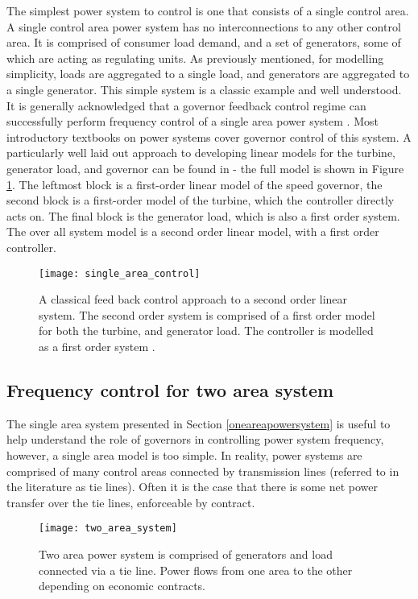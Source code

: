 The simplest power system to control is one that consists of a single control area. A single control area power system has no interconnections to any other control area. It is comprised of consumer load demand, and a set of generators, some of which are acting as regulating units. As previously mentioned, for modelling simplicity, loads are aggregated to a single load, and generators are aggregated to a single generator. This simple system is a classic example and well understood. It is generally acknowledged that a governor feedback control regime can successfully perform frequency control of a single area power system \cite{Wood2013, Grainger1994, Kothari2011}. Most introductory textbooks on power systems cover governor control of this system. A particularly well laid out approach to developing linear models for the turbine, generator load, and governor can be found in \cite{Kothari2011} - the full model is shown in Figure \ref{fig:singleareacontrol}. The leftmost block is a first-order linear model of the speed governor, the second block is a first-order model of the turbine, which the controller directly acts on. The final block is the generator load, which is also a first order system. The over all system model is a second order linear model, with a first order controller.

\begin{figure}[ht]
\centering
\texttt{[image: single\_area\_control]}
\caption{A classical feed back control approach to a second order linear system. The second order system is comprised of a first order model for both the turbine, and generator load. The controller is modelled as a first order system \cite{Kothari2011}.}
\label{fig:singleareacontrol}
\end{figure}


\subsection{Frequency control for two area system}
The single area system presented in Section \ref{oneareapowersystem} is useful to help understand the role of governors in controlling power system frequency, however, a single area model is too simple. In reality, power systems are comprised of many control areas connected by transmission lines (referred to in the literature as tie lines). Often it is the case that there is some net power transfer over the tie lines, enforceable by contract.

\begin{figure}[ht]
	\centering
	\texttt{[image: two\_area\_system]}
	\caption{Two area power system is comprised of generators and load connected via a tie line. Power flows from one area to the other depending on economic contracts.}
	\label{fig:twoareapower}
\end{figure}

